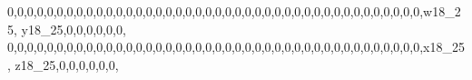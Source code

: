 \documentclass[]{article}
\newenvironment{Shaded}{\begin{snugshade}}{\end{snugshade}}
\newcommand{\DecValTok}[1]{\textcolor[rgb]{0.00,0.00,0.81}{#1}}
\newcommand{\NormalTok}[1]{#1}
\begin{document}
\begin{Shaded}
\begin{Highlighting}[]
\DecValTok{0}\NormalTok{,}\DecValTok{0}\NormalTok{,}\DecValTok{0}\NormalTok{,}\DecValTok{0}\NormalTok{,}\DecValTok{0}\NormalTok{,}\DecValTok{0}\NormalTok{,}\DecValTok{0}\NormalTok{,}\DecValTok{0}\NormalTok{,}\DecValTok{0}\NormalTok{,}\DecValTok{0}\NormalTok{,}\DecValTok{0}\NormalTok{,}\DecValTok{0}\NormalTok{,}\DecValTok{0}\NormalTok{,}\DecValTok{0}\NormalTok{,}\DecValTok{0}\NormalTok{,}\DecValTok{0}\NormalTok{,}\DecValTok{0}\NormalTok{,}\DecValTok{0}\NormalTok{,}\DecValTok{0}\NormalTok{,}\DecValTok{0}\NormalTok{,}\DecValTok{0}\NormalTok{,}\DecValTok{0}\NormalTok{,}\DecValTok{0}\NormalTok{,}\DecValTok{0}\NormalTok{,}\DecValTok{0}\NormalTok{,}\DecValTok{0}\NormalTok{,}\DecValTok{0}\NormalTok{,}\DecValTok{0}\NormalTok{,}\DecValTok{0}\NormalTok{,}\DecValTok{0}\NormalTok{,}\DecValTok{0}\NormalTok{,}\DecValTok{0}\NormalTok{,}\DecValTok{0}\NormalTok{,}\DecValTok{0}\NormalTok{,}\DecValTok{0}\NormalTok{,}\DecValTok{0}\NormalTok{,}\DecValTok{0}\NormalTok{,}\DecValTok{0}\NormalTok{,}\DecValTok{0}\NormalTok{,}\DecValTok{0}\NormalTok{,}\DecValTok{0}\NormalTok{,}\DecValTok{0}\NormalTok{,w18_}\DecValTok{25}\NormalTok{, y18_}\DecValTok{25}\NormalTok{,}\DecValTok{0}\NormalTok{,}\DecValTok{0}\NormalTok{,}\DecValTok{0}\NormalTok{,}\DecValTok{0}\NormalTok{,}\DecValTok{0}\NormalTok{,}\DecValTok{0}\NormalTok{,}
\DecValTok{0}\NormalTok{,}\DecValTok{0}\NormalTok{,}\DecValTok{0}\NormalTok{,}\DecValTok{0}\NormalTok{,}\DecValTok{0}\NormalTok{,}\DecValTok{0}\NormalTok{,}\DecValTok{0}\NormalTok{,}\DecValTok{0}\NormalTok{,}\DecValTok{0}\NormalTok{,}\DecValTok{0}\NormalTok{,}\DecValTok{0}\NormalTok{,}\DecValTok{0}\NormalTok{,}\DecValTok{0}\NormalTok{,}\DecValTok{0}\NormalTok{,}\DecValTok{0}\NormalTok{,}\DecValTok{0}\NormalTok{,}\DecValTok{0}\NormalTok{,}\DecValTok{0}\NormalTok{,}\DecValTok{0}\NormalTok{,}\DecValTok{0}\NormalTok{,}\DecValTok{0}\NormalTok{,}\DecValTok{0}\NormalTok{,}\DecValTok{0}\NormalTok{,}\DecValTok{0}\NormalTok{,}\DecValTok{0}\NormalTok{,}\DecValTok{0}\NormalTok{,}\DecValTok{0}\NormalTok{,}\DecValTok{0}\NormalTok{,}\DecValTok{0}\NormalTok{,}\DecValTok{0}\NormalTok{,}\DecValTok{0}\NormalTok{,}\DecValTok{0}\NormalTok{,}\DecValTok{0}\NormalTok{,}\DecValTok{0}\NormalTok{,}\DecValTok{0}\NormalTok{,}\DecValTok{0}\NormalTok{,}\DecValTok{0}\NormalTok{,}\DecValTok{0}\NormalTok{,}\DecValTok{0}\NormalTok{,}\DecValTok{0}\NormalTok{,}\DecValTok{0}\NormalTok{,}\DecValTok{0}\NormalTok{,x18_}\DecValTok{25}\NormalTok{, z18_}\DecValTok{25}\NormalTok{,}\DecValTok{0}\NormalTok{,}\DecValTok{0}\NormalTok{,}\DecValTok{0}\NormalTok{,}\DecValTok{0}\NormalTok{,}\DecValTok{0}\NormalTok{,}\DecValTok{0}\NormalTok{,}

\end{Highlighting}
\end{Shaded}
\end{document}
